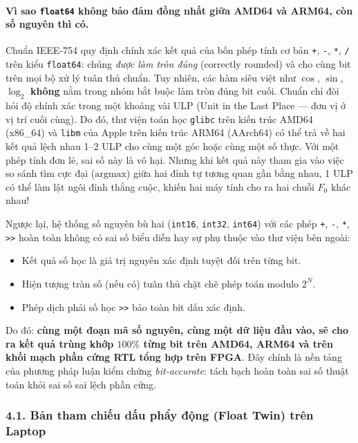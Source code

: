 \documentclass[11pt,a4paper]{article}
\begin{document}
\paragraph{Vì sao \texttt{float64} không bảo đảm đồng nhất giữa AMD64 và ARM64, còn số nguyên thì có.}
Chuẩn IEEE-754 quy định chính xác kết quả của bốn phép tính cơ bản \texttt{+}, \texttt{-}, \texttt{*}, \texttt{/} trên kiểu \texttt{float64}: chúng \emph{được làm tròn đúng} (correctly rounded) và cho cùng bit trên mọi bộ xử lý tuân thủ chuẩn. Tuy nhiên, các hàm siêu việt như $\cos$, $\sin$, $\log_2$ \textbf{không} nằm trong nhóm bắt buộc làm tròn đúng bit cuối. Chuẩn chỉ đòi hỏi độ chính xác trong một khoảng vài ULP (Unit in the Last Place --- đơn vị ở vị trí cuối cùng).
Do đó, thư viện toán học \texttt{glibc} trên kiến trúc AMD64 (x86\_64) và \texttt{libm} của Apple trên kiến trúc ARM64 (AArch64) có thể trả về hai kết quả lệch nhau 1--2 ULP cho cùng một góc hoặc cùng một số thực. Với một phép tính đơn lẻ, sai số này là vô hại. Nhưng khi kết quả này tham gia vào việc so sánh tìm cực đại ($\text{argmax}$) giữa hai đỉnh tự tương quan gần bằng nhau, 1 ULP có thể làm lật ngôi đỉnh thắng cuộc, khiến hai máy tính cho ra hai chuỗi $F_0$ khác nhau!

Ngược lại, hệ thống số nguyên bù hai (\texttt{int16}, \texttt{int32}, \texttt{int64}) với các phép \texttt{+}, \texttt{-}, \texttt{*}, \texttt{>>} hoàn toàn không có sai số biểu diễn hay sự phụ thuộc vào thư viện bên ngoài:
\begin{itemize}
    \setlength{\itemsep}{0.5pt}
    \item Kết quả số học là giá trị nguyên xác định tuyệt đối trên từng bit.
    \item Hiện tượng tràn số (nếu có) tuân thủ chặt chẽ phép toán modulo $2^N$.
    \item Phép dịch phải số học \texttt{>>} bảo toàn bit dấu xác định.
\end{itemize}
Do đó: \textbf{cùng một đoạn mã số nguyên, cùng một dữ liệu đầu vào, sẽ cho ra kết quả trùng khớp $100\%$ từng bit trên AMD64, ARM64 và trên khối mạch phần cứng RTL tổng hợp trên FPGA}. Đây chính là nền tảng của phương pháp luận kiểm chứng \emph{bit-accurate}: tách bạch hoàn toàn sai số thuật toán khỏi sai số sai lệch phần cứng.

\subsubsection*{4.1. Bản tham chiếu dấu phẩy động (Float Twin) trên Laptop}
\end{document}
